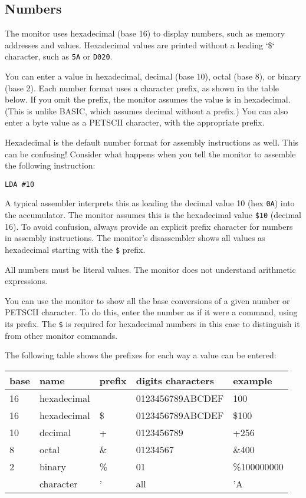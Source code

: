 \subsection{Numbers}
\label{sec:numbers}

The monitor uses hexadecimal (base 16) to display numbers, such as memory addresses and values. Hexadecimal values are printed without a leading `\$` character, such as {\tt 5A} or {\tt D020}.

You can enter a value in hexadecimal, decimal (base 10), octal (base 8), or binary (base 2). Each number format uses a character prefix, as shown in the table below. If you omit the prefix, the monitor assumes the value is in hexadecimal. (This is unlike BASIC, which assumes decimal without a prefix.) You can also enter a byte value as a PETSCII character, with the appropriate prefix.

Hexadecimal is the default number format for assembly instructions as well. This can be confusing! Consider what happens when you tell the monitor to assemble the following instruction:

\begin{verbatim}
LDA #10
\end{verbatim}

A typical assembler interprets this as loading the decimal value 10 (hex {\tt 0A}) into the accumulator. The monitor assumes this is the hexadecimal value {\tt \$10} (decimal 16). To avoid confusion, always provide an explicit prefix character for numbers in assembly instructions. The monitor's disassembler shows all values as hexadecimal starting with the {\tt \$} prefix.

All numbers must be literal values. The monitor does not understand arithmetic expressions.

You can use the monitor to show all the base conversions of a given number or PETSCII character. To do this, enter the number as if it were a command, using its prefix. The {\tt \$} is required for hexadecimal numbers in this case to distinguish it from other monitor commands.

The following table shows the prefixes for each way a value can be entered:

{\ttfamily
{\setlength{\tabcolsep}{1mm}
\begin{center}
\begin{tabular}{|l|l|l|l|l|}
\hline
 base  & name & prefix & digits characters & example     \\
\hline
16 & hexadecimal  &     & 0123456789ABCDEF &   100       \\
16 & hexadecimal  & \$  & 0123456789ABCDEF & \$100       \\
10 & decimal      &  +  & 0123456789       & +256        \\
 8 & octal        & \&  & 01234567         & \&400       \\
 2 & binary       & \%  & 01               & \%100000000 \\
   & character    &  '  & all              & 'A          \\
\hline
\end{tabular}
\end{center}
}
}

